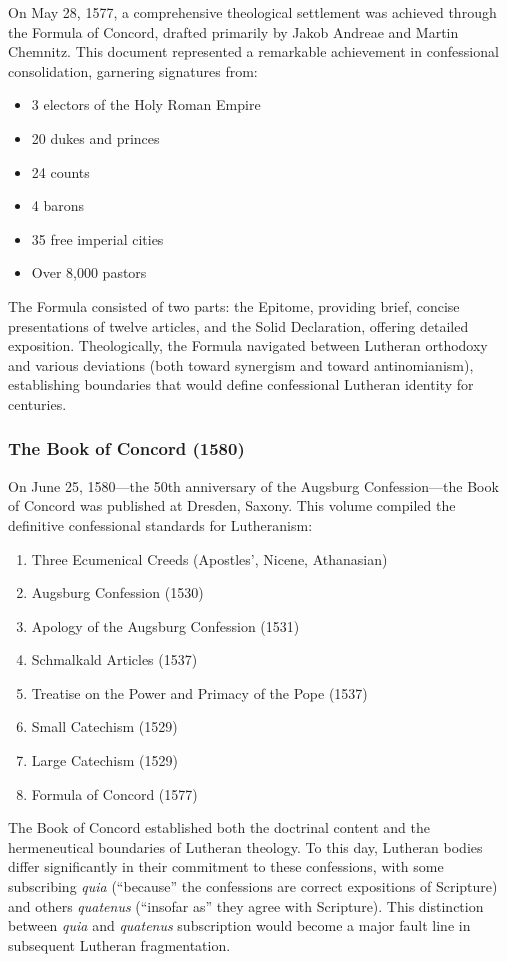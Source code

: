 On May 28, 1577, a comprehensive theological settlement was achieved through the Formula of Concord, drafted primarily by Jakob Andreae and Martin Chemnitz. This document represented a remarkable achievement in confessional consolidation, garnering signatures from:

\begin{itemize}
\item 3 electors of the Holy Roman Empire
\item 20 dukes and princes
\item 24 counts
\item 4 barons
\item 35 free imperial cities
\item Over 8,000 pastors
\end{itemize}

The Formula consisted of two parts: the Epitome, providing brief, concise presentations of twelve articles, and the Solid Declaration, offering detailed exposition. Theologically, the Formula navigated between Lutheran orthodoxy and various deviations (both toward synergism and toward antinomianism), establishing boundaries that would define confessional Lutheran identity for centuries.

\subsubsection{The Book of Concord (1580)}

On June 25, 1580---the 50th anniversary of the Augsburg Confession---the Book of Concord was published at Dresden, Saxony. This volume compiled the definitive confessional standards for Lutheranism:

\begin{enumerate}
\item Three Ecumenical Creeds (Apostles', Nicene, Athanasian)
\item Augsburg Confession (1530)
\item Apology of the Augsburg Confession (1531)
\item Schmalkald Articles (1537)
\item Treatise on the Power and Primacy of the Pope (1537)
\item Small Catechism (1529)
\item Large Catechism (1529)
\item Formula of Concord (1577)
\end{enumerate}

The Book of Concord established both the doctrinal content and the hermeneutical boundaries of Lutheran theology. To this day, Lutheran bodies differ significantly in their commitment to these confessions, with some subscribing \textit{quia} (``because'' the confessions are correct expositions of Scripture) and others \textit{quatenus} (``insofar as'' they agree with Scripture). This distinction between \textit{quia} and \textit{quatenus} subscription would become a major fault line in subsequent Lutheran fragmentation.

